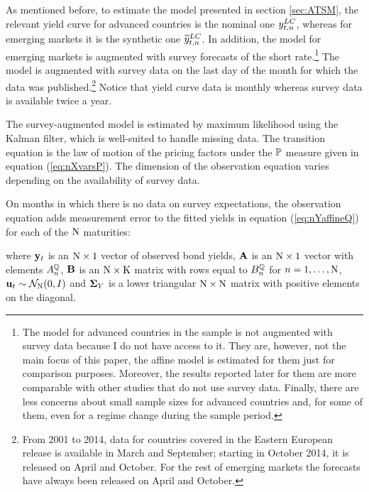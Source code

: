 {As mentioned before, to estimate the model presented in section \ref{sec:ATSM}, the relevant yield curve for advanced countries is the nominal one \(y_{t,n} ^{LC}\), whereas for emerging markets it is the synthetic one \(\widetilde{y}_{t,n} ^{LC}\).
In addition, the model for emerging markets is augmented with survey forecasts of the short rate.\footnote{ The model for advanced countries in the sample is not augmented with survey data because I do not have access to it. They are, however, not the main focus of this paper, the affine model is estimated for them just for comparison purposes. Moreover, the results reported later for them are more comparable with other studies that do not use survey data. Finally, there are less concerns about small sample sizes for advanced countries and, for some of them, even for a regime change during the sample period.} 
The model is augmented with survey data on the last day of the month for which the data was published.\footnote{ From 2001 to 2014, data for countries covered in the Eastern European release is available in March and September; starting in October 2014, it is released on April and October. For the rest of emerging markets the forecasts have always been released on April and October.}
Notice that yield curve data is monthly whereas survey data is available twice a year.

The survey-augmented model is estimated by maximum likelihood using the Kalman filter, which is well-suited to handle missing data. 
The transition equation is the law of motion of the pricing factors under the \(\mathbb{P}\) measure given in equation (\ref{eq:nXvarsP}).
The dimension of the observation equation varies depending on the availability of survey data. 

On months in which there is no data on survey expectations, the observation equation adds measurement error to the fitted yields in equation (\ref{eq:nYaffineQ}) for each of the \(\mathrm{N}\) maturities:
	
\noindent where \(\mathbf{y}_{t}\) is an \(\mathrm{N} \times 1\) vector of observed bond yields, \(\mathbf{A}\) is an \(\mathrm{N} \times 1\) vector with elements \(A_{n}^{\mathbb{Q}}\), \(\mathbf{B}\) is an \(\mathrm{N} \times \mathrm{K}\) matrix with rows equal to \(B_{n}^{\mathbb{Q}}\) for \(n = 1, \ldots, \mathrm{N}\), \(\mathbf{u}_{t} \sim \mathcal{N}_{\mathrm{N}} (0,I) \) and \(\mathbf{\mathbf{\Sigma}}_{Y}\) is a lower triangular \(\mathrm{N} \times \mathrm{N}\) matrix with positive elements on the diagonal.

}

